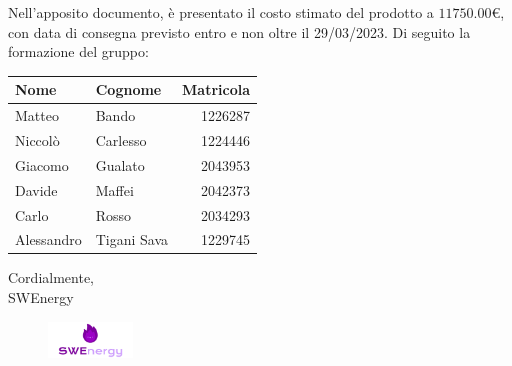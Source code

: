 Nell’apposito documento, è presentato il costo stimato del prodotto a 
$11750.00$€, 
con data di consegna previsto entro e non oltre il 29/03/2023. Di seguito la
formazione del gruppo:

\begin{center}
{
\renewcommand{\arraystretch}{1.5}
\begin{tabular}{llr}
	\textbf{Nome} & \textbf{Cognome}	& \textbf{Matricola}	\\
	\toprule
	Matteo		&	Bando				&	1226287					\\
	Niccolò 	&	Carlesso		 	& 	1224446					\\
	Giacomo 	&	Gualato			 	& 	2043953					\\
	Davide		&	Maffei			 	& 	2042373					\\
	Carlo		&	Rosso			 	&	2034293				\\
	Alessandro	&	Tigani Sava		 	&	1229745				\\
	\bottomrule
\end{tabular}
}
\end{center}

\vspace{1cm}

\noindent
Cordialmente, \\
SWEnergy

\begin{figure}[H]
	\includegraphics[width=0.2\textwidth]{img/logo.png}
\end{figure}
